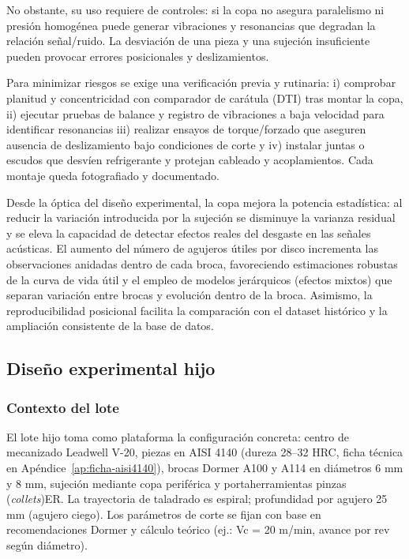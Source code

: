 \documentclass[12pt, letterpaper]{report}
\begin{document}
No obstante, su uso requiere de controles: si la copa no asegura paralelismo ni presión homogénea puede generar vibraciones y resonancias que degradan la relación señal/ruido. La desviación de una pieza y una sujeción insuficiente pueden provocar errores posicionales y deslizamientos. 

Para minimizar riesgos se exige una verificación previa y rutinaria: i) comprobar planitud y concentricidad con comparador de carátula (DTI) tras montar la copa, ii) ejecutar pruebas de balance y registro de vibraciones a baja velocidad para identificar resonancias iii) realizar ensayos de torque/forzado que aseguren ausencia de deslizamiento bajo condiciones de corte y iv) instalar juntas o escudos que desvíen refrigerante y protejan cableado y acoplamientos. Cada montaje queda fotografiado y documentado.

Desde la óptica del diseño experimental, la copa mejora la potencia estadística: al reducir la variación introducida por la sujeción se disminuye la varianza residual y se eleva la capacidad de detectar efectos reales del desgaste en las señales acústicas. El aumento del número de agujeros útiles por disco incrementa las observaciones anidadas dentro de cada broca, favoreciendo estimaciones robustas de la curva de vida útil y el empleo de modelos jerárquicos (efectos mixtos) que separan variación entre brocas y evolución dentro de la broca. Asimismo, la reproducibilidad posicional facilita la comparación con el dataset histórico y la ampliación consistente de la base de datos.

\subsection{Diseño experimental hijo}

\subsubsection{Contexto del lote}

El lote hijo toma como plataforma la configuración concreta: centro de mecanizado Leadwell V-20, piezas en AISI 4140 (dureza 28--32 HRC, ficha técnica en Apéndice~\ref{ap:ficha-aisi4140}), brocas Dormer A100 y A114 en diámetros 6 mm y 8 mm, sujeción mediante copa periférica y portaherramientas pinzas (\textit{collets})ER. La trayectoria de taladrado es espiral; profundidad por agujero 25 mm (agujero ciego). Los parámetros de corte se fijan con base en recomendaciones Dormer y cálculo teórico (ej.: Vc = 20 m/min, avance por rev según diámetro).
\end{document}
